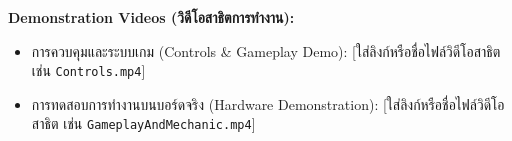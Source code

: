 \documentclass[12pt,a4paper]{article}
\begin{document}
\noindent\textbf{Demonstration Videos (วิดีโอสาธิตการทำงาน):}
\begin{itemize}[leftmargin=1.5cm]
    \item การควบคุมและระบบเกม (Controls \& Gameplay Demo): [ใส่ลิงก์หรือชื่อไฟล์วิดีโอสาธิต เช่น \texttt{Controls.mp4}]
    \item การทดสอบการทำงานบนบอร์ดจริง (Hardware Demonstration): [ใส่ลิงก์หรือชื่อไฟล์วิดีโอสาธิต เช่น \texttt{GameplayAndMechanic.mp4}]
\end{itemize}
\end{document}
